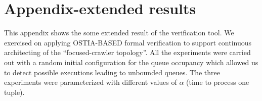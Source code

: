 \onecolumn
% 
%
%
%
%
%


\section{Appendix-extended results}\label{app:extended-exp-results}
\noindent
This appendix shows the some extended result of the verification tool.
We exercised on applying OSTIA-BASED formal verification to support continuous architecting of the ``focused-crawler topology''.
All the experiments were carried out with a random initial configuration for the queue occupancy which allowed us to detect possible executions leading to unbounded queues.
The three experiments were parameterized with different values of $ \alpha $ (time to process  one tuple).


